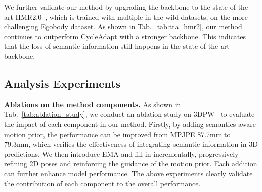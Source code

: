 We further validate our method by upgrading the backbone to the state-of-the-art HMR2.0~\cite{hmr2}, which is trained with multiple in-the-wild datasets, on the more challenging Egobody dataset.
As shown in Tab.~\ref{tab:tta_hmr2}, our method continues to outperform CycleAdapt with a stronger backbone.
This indicates that the loss of semantic information still happens in the state-of-the-art backbone.



\subsection{Analysis Experiments}

\textbf{Ablations on the method components.}
As shown in Tab.~\ref{tab:ablation_study}, we conduct an ablation study on 3DPW~\cite{3dpw} to evaluate the impact of each component in our method. Firstly, by adding semantics-aware motion prior, the performance can be improved from MPJPE 87.7mm to 79.3mm, which verifies the effectiveness of integrating semantic information in 3D predictions. 
We then introduce EMA and fill-in incrementally, progressively refining 2D poses and reinforcing the guidance of the motion prior. Each addition can further enhance model performance. 
The above experiments clearly validate the contribution of each component to the overall performance. 

\begin{table}[t]
    \caption{Ablation study of method components on the 3DPW dataset~\cite{3dpw} based on HMR network, demonstrating the incremental improvements achieved by each component.}
    \label{tab:ablation_study} 
    \centering
    \vspace{-0.1in}
\end{table}

